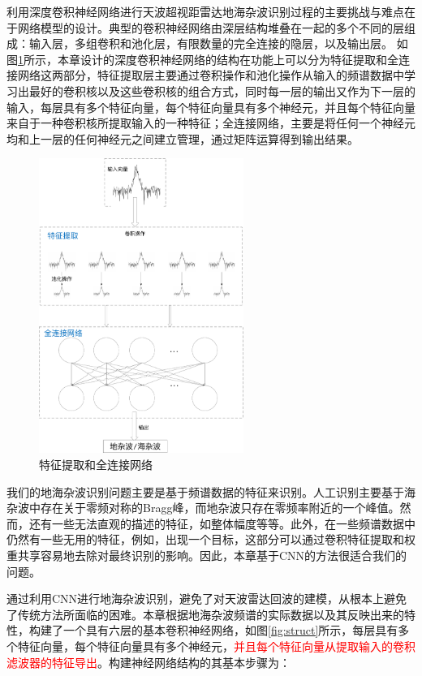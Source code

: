 利用深度卷积神经网络进行天波超视距雷达地海杂波识别过程的主要挑战与难点在于网络模型的设计。典型的卷积神经网络由深层结构堆叠在一起的多个不同的层组成：输入层，多组卷积和池化层，有限数量的完全连接的隐层，以及输出层。
如图\ref{fig:fullconnect}所示，本章设计的深度卷积神经网络的结构在功能上可以分为特征提取和全连接网络这两部分，特征提取层主要通过卷积操作和池化操作从输入的频谱数据中学习出最好的卷积核以及这些卷积核的组合方式，同时每一层的输出又作为下一层的输入，每层具有多个特征向量，每个特征向量具有多个神经元，并且每个特征向量来自于一种卷积核所提取输入的一种特征；全连接网络，主要是将任何一个神经元均和上一层的任何神经元之间建立管理，通过矩阵运算得到输出结果。
\begin{figure}[hbt]
	\centering
	\includegraphics[width=6.67cm]{figures/othr/fullconnect}
	\caption{特征提取和全连接网络}
	\label{fig:fullconnect}
\end{figure}

我们的地海杂波识别问题主要是基于频谱数据的特征来识别。人工识别主要基于海杂波中存在关于零频对称的Bragg峰，而地杂波只存在零频率附近的一个峰值。然而，还有一些无法直观的描述的特征，如整体幅度等等。此外，在一些频谱数据中仍然有一些无用的特征，例如，出现一个目标，这部分可以通过卷积特征提取和权重共享容易地去除对最终识别的影响。因此，本章基于CNN的方法很适合我们的问题。

通过利用CNN进行地海杂波识别，避免了对天波雷达回波的建模，从根本上避免了传统方法所面临的困难。本章根据地海杂波频谱的实际数据以及其反映出来的特性，构建了一个具有六层的基本卷积神经网络，如图\ref{fig:struct}所示，每层具有多个特征向量，每个特征向量具有多个神经元，\textcolor{red}{并且每个特征向量从提取输入的卷积滤波器的特征导出}。构建神经网络结构的其基本步骤为：

